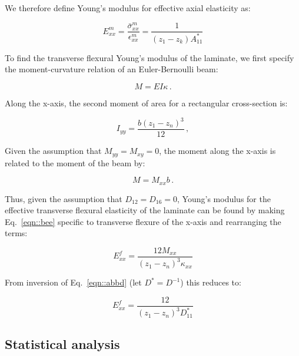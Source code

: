 \documentclass[twocolumn, linenumbers, superscriptaddress]{revtex4-1}
\begin{document}
				We therefore define Young's modulus for effective axial elasticity as:
				
				\begin{equation}
					E^m_{xx} = \frac{\bar{\sigma}^m_{xx}}{\epsilon^m_{xx}} = \frac{1}{(z_1 - z_k)A^*_{11}}
				\end{equation}
				
				To find the transverse flexural Young's modulus of the laminate, we first specify the moment-curvature relation of an Euler-Bernoulli beam:
				
				\begin{equation}
				\label{eqn::bee}
				M = EI\kappa\,.
				\end{equation}
				
				Along the x-axis, the second moment of area for a rectangular cross-section is:
				
				\begin{equation}
					I_{yy} = \frac{b(z_1 - z_n)^3}{12}\,,
				\end{equation}	
				
				Given the assumption that $M_{yy} = M_{xy} = 0$, the moment along the x-axis is related to the moment of the beam by:
				
				\begin{equation}
					M = M_{xx}b\,.
				\end{equation}
				
				Thus, given the assumption that $D_{12} = D_{16} = 0$, Young's modulus for the effective transverse flexural elasticity of the laminate can be found by making Eq.~\ref{eqn::bee} specific to transverse flexure of the x-axis and rearranging the terms:
				
				\begin{equation}
					E^f_{xx} = \frac{12M_{xx}}{(z_1 - z_n)^3\kappa_{xx}}
				\end{equation}
				
				From inversion of Eq.~\ref{eqn::abbd} (let $D^* = D^{-1}$) this reduces to:
				
				\begin{equation}
					E^f_{xx} = \frac{12}{(z_1 - z_n)^3D^*_{11}}
				\end{equation}
					
		\subsection*{Statistical analysis}
\end{document}
